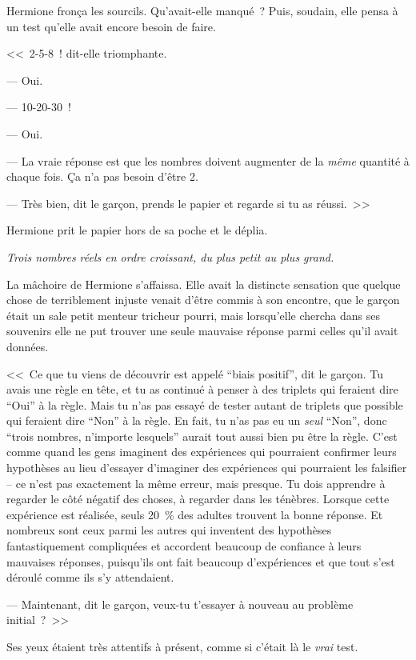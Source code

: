 Hermione fronça les sourcils. Qu'avait-elle manqué~? Puis, soudain, elle pensa à un test qu'elle avait encore besoin de faire.

<<~2-5-8~! dit-elle triomphante.

--- Oui.

--- 10-20-30~!

--- Oui.

--- La vraie réponse est que les nombres doivent augmenter de la \emph{même} quantité à chaque fois. Ça n'a pas besoin d'être 2.

--- Très bien, dit le garçon, prends le papier et regarde si tu as réussi.~>>

Hermione prit le papier hors de sa poche et le déplia.

\emph{Trois nombres réels en ordre croissant, du plus petit au plus grand.}

La mâchoire de Hermione s'affaissa. Elle avait la distincte sensation que quelque chose de terriblement injuste venait d'être commis à son encontre, que le garçon était un sale petit menteur tricheur pourri, mais lorsqu'elle chercha dans ses souvenirs elle ne put trouver une seule mauvaise réponse parmi celles qu'il avait données.

<<~Ce que tu viens de découvrir est appelé “biais positif”, dit le garçon. Tu avais une règle en tête, et tu as continué à penser à des triplets qui feraient dire “Oui” à la règle. Mais tu n'as pas essayé de tester autant de triplets que possible qui feraient dire “Non” à la règle. En fait, tu n'as pas eu un \emph{seul} “Non”, donc “trois nombres, n'importe lesquels” aurait tout aussi bien pu être la règle. C'est comme quand les gens imaginent des expériences qui pourraient confirmer leurs hypothèses au lieu d'essayer d'imaginer des expériences qui pourraient les falsifier -- ce n'est pas exactement la même erreur, mais presque. Tu dois apprendre à regarder le côté négatif des choses, à regarder dans les ténèbres. Lorsque cette expérience est réalisée, seuls 20~\% des adultes trouvent la bonne réponse. Et nombreux sont ceux parmi les autres qui inventent des hypothèses fantastiquement compliquées et accordent beaucoup de confiance à leurs mauvaises réponses, puisqu'ils ont fait beaucoup d'expériences et que tout s'est déroulé comme ils s'y attendaient.

--- Maintenant, dit le garçon, veux-tu t'essayer à nouveau au problème initial~?~>>

Ses yeux étaient très attentifs à présent, comme si c'était là le \emph{vrai} test.

